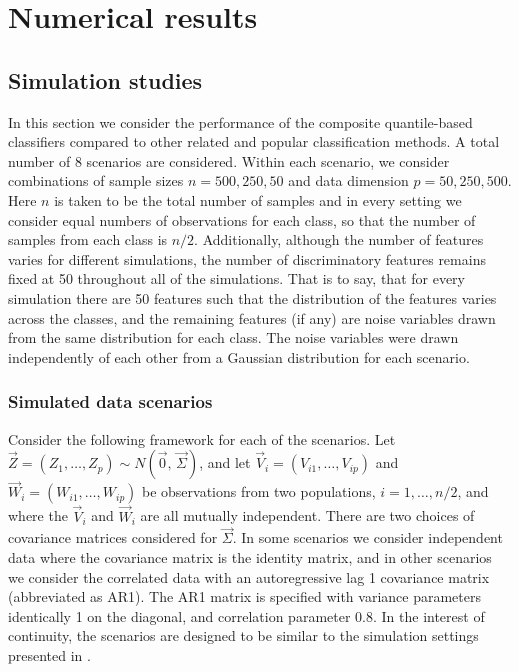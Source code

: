 

\section{Numerical results}
\label{sec:numerical-results}


\subsection{Simulation studies}
\label{sec:simulation-studies}

In this section we consider the performance of the composite quantile-based
classifiers compared to other related and popular classification methods.  A
total number of 8 scenarios are considered.  Within each scenario, we consider
combinations of sample sizes $n = 500, 250, 50$ and data dimension
$p = 50, 250, 500$.  Here $n$ is taken to be the total number of samples and in
every setting we consider equal numbers of observations for each class, so that
the number of samples from each class is $n / 2$.  Additionally, although the
number of features varies for different simulations, the number of
discriminatory features remains fixed at 50 throughout all of the simulations.
That is to say, that for every simulation there are 50 features such that the
distribution of the features varies across the classes, and the remaining
features (if any) are noise variables drawn from the same distribution for each
class.  The noise variables were drawn independently of each other from a
Gaussian distribution for each scenario.


\subsubsection{Simulated data scenarios}
\label{sec:simulated-data-scenarios}

Consider the following framework for each of the scenarios.  Let
$\vec{Z} = (Z_1, \dots, Z_p) \sim N(\vec{0},\, \vec{\Sigma})$, and let
$\vec{V}_i = (V_{i1}, \dots, V_{ip})$ and $\vec{W}_i = (W_{i1}, \dots, W_{ip})$
be observations from two populations, $i = 1, \dots, n / 2$, and where the
$\vec{V}_i$ and $\vec{W}_i$ are all mutually independent.  There are two choices
of covariance matrices considered for $\vec{\Sigma}$.  In some scenarios we
consider independent data where the covariance matrix is the identity matrix,
and in other scenarios we consider the correlated data with an autoregressive
lag 1 covariance matrix (abbreviated as AR1).  The AR1 matrix is specified with
variance parameters identically 1 on the diagonal, and correlation parameter
0.8.  In the interest of continuity, the scenarios are designed to be similar to
the simulation settings presented in \cite{hennig2016}.

